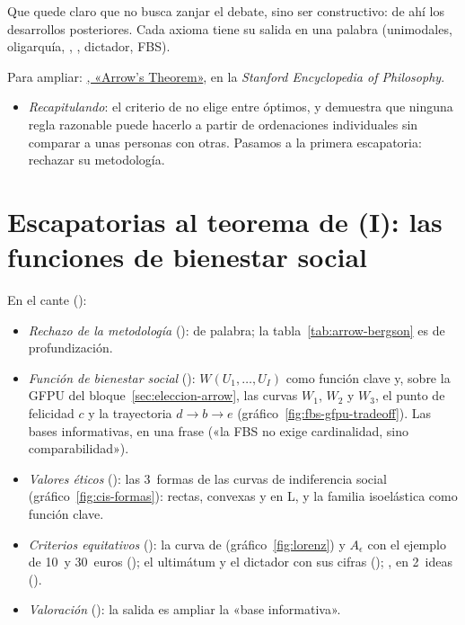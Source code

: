 \documentclass[11pt]{article}
\begin{document}
\begin{notaopositor}
Que quede claro que  no busca zanjar el debate, sino ser constructivo: de ahí los desarrollos posteriores. Cada axioma tiene su salida en una palabra (unimodales, oligarquía, , , dictador, FBS).
\end{notaopositor}

\begin{anotaciones}
Para ampliar: \href{https://plato.stanford.edu/archives/win2025/entries/arrows-theorem/}{, «Arrow's Theorem»}, en la \emph{Stanford Encyclopedia of Philosophy}\nocite{Morreau2025Arrow}.
\end{anotaciones}

\begin{itemize}
\item \emph{Recapitulando}: el criterio de  no elige entre óptimos, y  demuestra que ninguna regla razonable puede hacerlo a partir de ordenaciones individuales sin comparar a unas personas con otras. Pasamos a la primera escapatoria: rechazar su metodología.
\end{itemize}


\section{Escapatorias al teorema de  (I):\cortetitulo{} las funciones de bienestar social}\label{sec:fbs}

\begin{notaopositor}
En el cante ():
\begin{itemize}
\item \emph{Rechazo de la metodología} (): de palabra; la tabla~\ref{tab:arrow-bergson} es de profundización.
\item \emph{Función de bienestar social} (): $W(U_1,\dots,U_I)$ como función clave y, sobre la GFPU del bloque~\ref{sec:eleccion-arrow}, las curvas $W_1$, $W_2$ y $W_3$, el punto de felicidad $c$ y la trayectoria $d\to b\to e$ (gráfico~\ref{fig:fbs-gfpu-tradeoff}). Las bases informativas, en una frase («la FBS no exige cardinalidad, sino comparabilidad»).
\item \emph{Valores éticos} (): las 3~formas de las curvas de indiferencia social (gráfico~\ref{fig:cis-formas}): rectas, convexas y en L, y la familia isoelástica como función clave.
\item \emph{Criterios equitativos} (): la curva de  (gráfico~\ref{fig:lorenz}) y $A_\epsilon$ con el ejemplo de 10~y 30~euros (); el ultimátum y el dictador con sus cifras (); , en 2~ideas ().
\item \emph{Valoración} (): la salida es ampliar la «base informativa».
\end{itemize}
\end{notaopositor}
\end{document}
